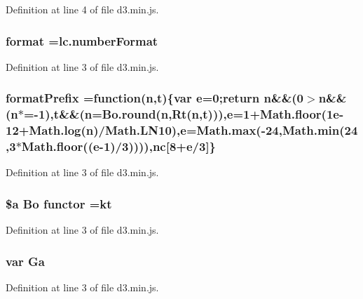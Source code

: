 Definition at line 4 of file d3.\+min.\+js.

\subsubsection[{format}]{ format =lc.\+number\+Format}\label{d3_8min_8js_a536c52fc21dae6f28babc6557c0753e3}


Definition at line 3 of file d3.\+min.\+js.

\subsubsection[{format\+Prefix}]{ format\+Prefix =function({\bf n},t)\{var {\bf e}=0;{\bf return} {\bf n}\&\&(0$>${\bf n}\&\&({\bf n}$\ast$=-\/1),t\&\&({\bf n}={\bf Bo.\+round}({\bf n},Rt({\bf n},t))),{\bf e}=1+Math.\+floor(1e-\/12+\+Math.\+log(n)/\+Math.\+L\+N10),e=\+Math.\+max(-\/24,\+Math.\+min(24,3$\ast$\+Math.\+floor((e-\/1)/3)))),nc[8+e/3]\}}\label{d3_8min_8js_aaa69a3c4f86e1d64824fcf675267af62}


Definition at line 3 of file d3.\+min.\+js.

\subsubsection[{functor}]{\setlength{\rightskip}{0pt plus 5cm}\${\bf a} {\bf Bo} functor =kt}\label{d3_8min_8js_a37892e5c71fe6450c8e67085660fcccb}


Definition at line 3 of file d3.\+min.\+js.

\subsubsection[{Ga}]{\setlength{\rightskip}{0pt plus 5cm}var Ga}\label{d3_8min_8js_a71efb5db77b3b3f1f9f4c3fd1c231e82}


Definition at line 3 of file d3.\+min.\+js.

